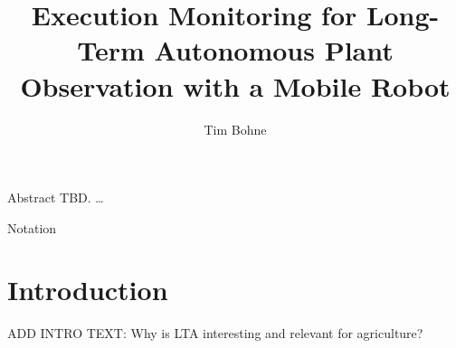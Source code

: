 \documentclass[english, master, utf8]{base/thesis_KBS}
\begin{document}
\setcounter{secnumdepth}{3}

\title{Execution Monitoring for Long-Term Autonomous Plant Observation with a Mobile Robot}
\author{Tim Bohne}

\generatetitle

\cleardoublepage

\begin{prefacesection}{Abstract}
TBD. \dots
\end{prefacesection}

\pagebreak

\begin{prefacesection}{Notation}
    \begin{figure}[H]
        \centering
    \end{figure}
\end{prefacesection}

\cleardoublepage
\tableofcontents

\startTextChapters %

\chapter{Introduction}

ADD INTRO TEXT: Why is LTA interesting and relevant for agriculture?\newline
\end{document}
